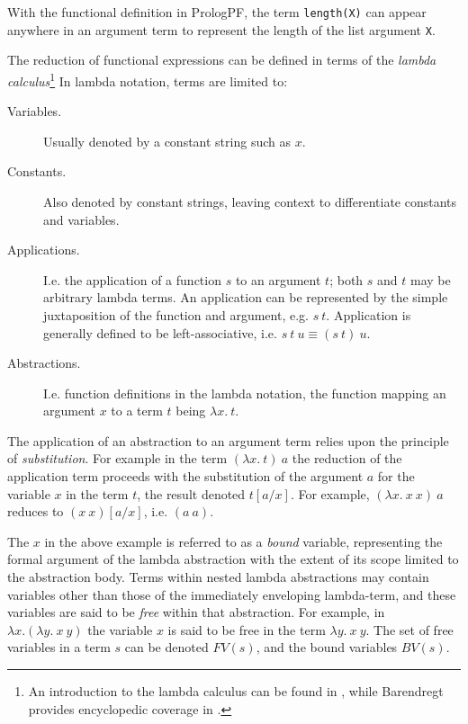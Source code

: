 With the functional definition in PrologPF, the term \texttt{length(X)} can appear
anywhere in an argument term to represent the length of the list argument
\texttt{X}.

The reduction of functional expressions can be defined in terms of the
\textit{lambda calculus}\footnote{An introduction to the lambda calculus can be
found in \cite{HS86}, while Barendregt provides encyclopedic coverage in \cite{Bar84}.}
In lambda notation, terms are limited to:
\begin{description}
\item[Variables.]{Usually denoted by a constant string such as $x$.}
\item[Constants.]{Also denoted by constant strings, leaving context to
  differentiate constants and variables.}
\item[Applications.]{I.e. the application of a function $s$ to an
  argument $t$; both $s$ and $t$ may be arbitrary lambda terms.  An application
  can be represented by the simple juxtaposition of the function and argument,
  e.g. $s\ t$.  Application is generally defined to be left-associative, i.e.
  $s\ t\ u \equiv (s\ t)\ u$.}
\item[Abstractions.]{I.e. function definitions in the lambda notation, the function
  mapping an argument $x$ to a term $t$ being $\lambda x.\ t$.}
\end{description}

The application of an abstraction to an argument term relies upon the
principle of \textit{substitution}.  For example in the term
$(\lambda x.\ t)\ a$ the reduction of the application term proceeds with
the substitution of the argument $a$ for the variable $x$ in the term $t$, the
result denoted $t[a/x]$.  For example, $(\lambda x.\ x\ x)\ a$ reduces to
$(x\ x)[a/x]$, i.e. $(a\ a)$.

The $x$ in the above example is referred to as a \textit{bound} variable, representing
the formal argument of the lambda abstraction with the extent of its scope limited to
the abstraction body.  Terms within nested lambda abstractions may contain variables
other than those of the immediately enveloping lambda-term, and these variables are
said to be \textit{free} within that abstraction.  For example, in
$\lambda x.( \lambda y.\ x\ y)$ the variable $x$ is said to be free in the term
$\lambda y.\ x\ y$.  The set of free variables in a term $s$ can be denoted $FV(s)$, and 
the bound variables $BV(s)$.

